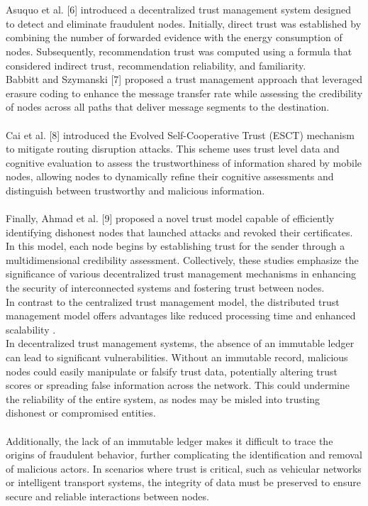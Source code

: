 \documentclass[11pt]{IEEEphot}
\begin{document}
\\
\\
Asuquo et al. [6] introduced a decentralized trust management system designed to detect and eliminate fraudulent nodes. Initially, direct trust was established by combining the number of forwarded evidence with the energy consumption of nodes. Subsequently, recommendation trust was computed using a formula that considered indirect trust, recommendation reliability, and familiarity. 
\\
Babbitt and Szymanski [7] proposed a trust management approach that leveraged erasure coding to enhance the message transfer rate while assessing the credibility of nodes across all paths that deliver message segments to the destination.
\\
\\
Cai et al. [8] introduced the Evolved Self-Cooperative Trust (ESCT) mechanism to mitigate routing disruption attacks. This scheme uses trust level data and cognitive evaluation to assess the trustworthiness of information shared by mobile nodes, allowing nodes to dynamically refine their cognitive assessments and distinguish between trustworthy and malicious information.
\\
\\
Finally, Ahmad et al. [9] proposed a novel trust model capable of efficiently identifying dishonest nodes that launched attacks and revoked their certificates. In this model, each node begins by establishing trust for the sender through a multidimensional credibility assessment. Collectively, these studies emphasize the significance of various decentralized trust management mechanisms in enhancing the security of interconnected systems and fostering trust between nodes.
\\
In contrast to the centralized trust management model, the distributed trust management model offers advantages like reduced processing time and enhanced scalability .
\\
In decentralized trust management systems, the absence of an immutable ledger can lead to significant vulnerabilities. Without an immutable record, malicious nodes could easily manipulate or falsify trust data, potentially altering trust scores or spreading false information across the network. This could undermine the reliability of the entire system, as nodes may be misled into trusting dishonest or compromised entities. 
\\
\\
Additionally, the lack of an immutable ledger makes it difficult to trace the origins of fraudulent behavior, further complicating the identification and removal of malicious actors. In scenarios where trust is critical, such as vehicular networks or intelligent transport systems, the integrity of data must be preserved to ensure secure and reliable interactions between nodes.
\end{document}
